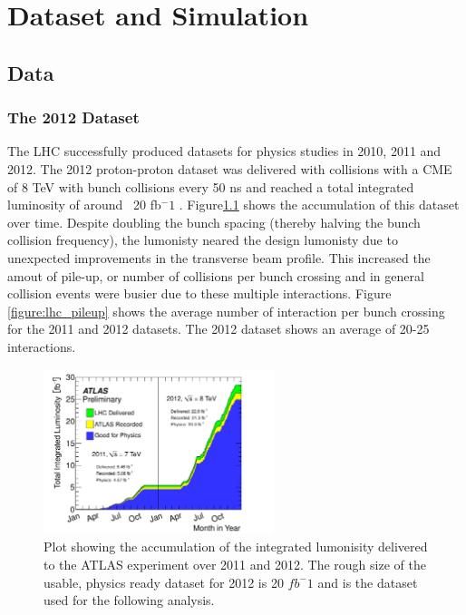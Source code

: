 \chapter[Dataset and Simulation][Dataset and Simulation]{Dataset and Simulation}

\section{Data}

\subsection{The 2012 Dataset} 

The LHC successfully produced datasets for physics studies in 2010, 2011 and 2012. The 2012 
proton-proton dataset was delivered with collisions with a CME of 8 TeV with bunch collisions
every 50 ns and reached a total integrated luminosity of around ~20 fb$^-1$ \cite{Aad:2013ucp}.
Figure\ref{figure:lhc_lumi} shows the accumulation of this dataset over time. 
Despite doubling the bunch spacing (thereby halving the bunch collision frequency), the lumonisty neared
the design lumonisty due to unexpected improvements in the transverse beam profile\cite{Carli:1424362}. This increased
the amout of pile-up, or number of collisions per bunch crossing and in general collision
events were busier due to these multiple interactions. Figure \ref{figure:lhc_pileup} shows
the average number of interaction per bunch crossing for the 2011 and 2012 datasets. The 2012
dataset shows an average of 20-25 interactions. 
\begin{figure}[!t]
\centering 
\includegraphics[width=0.60\textwidth]{figs/intlumivstime2011-2012DQ.pdf}
\caption{ Plot showing the accumulation of the integrated lumonisity delivered to the ATLAS experiment over 2011 and 2012. The rough size of the usable, physics ready dataset for 2012 is 20 $fb^-1$ and is the dataset used for the following analysis. 
}
\label{figure:lhc_lumi}
\end{figure}


